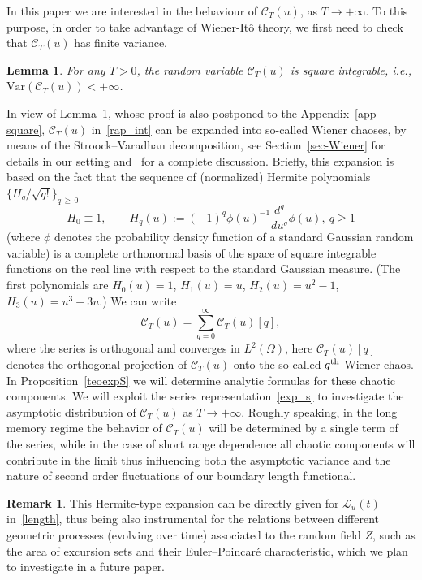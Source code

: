 \documentclass[10pt]{amsart}
\newtheorem{lemm}[theo]{Lemma}\newtheorem{prop}[theo]{Proposition}\newtheorem{coro}[theo]{Corollary}\newtheorem{conj}[theo]{Conjecture}
\theoremstyle{definition}\newtheorem{defi}[theo]{Definition}\newtheorem{rema}[theo]{Remark}\newtheorem{exam}[theo]{Example}\newtheorem{exem}[theo]{Example}\newtheorem{nota}[theo]{Notation}
\newcommand{\clC}{\mathcal{C}}
\newcommand{\clL}{\mathcal{L}}
\newcommand{\rVar}{\mathrm{Var}}
\begin{document}
In this paper we are interested in the behaviour of $\clC_T(u)$, as $ T\to +\infty$. To this purpose, in order to take advantage of Wiener-It\^o theory, we first need to check that $\clC_T(u)$ has finite variance.

\begin{lemm}\label{squareL}
For any $T>0$, the random variable $\clC_T(u)$ is square integrable, i.e., $\rVar(\clC_T(u)) < +\infty$.
\end{lemm}

In view of Lemma~\ref{squareL}, whose proof is also postponed to the Appendix~\ref{app-square}, $\clC_T (u)$ in~\eqref{rap_int} can be expanded into so-called Wiener chaoses, by means of the Stroock--Varadhan decomposition, see Section~\ref{sec-Wiener} for details in our setting and~\cite[\S~2.2] {noupebook} for a complete discussion. Briefly, this expansion is based on the fact that the sequence of (normalized) Hermite polynomials
$\{ H_q/\sqrt{q!}\}_{q\,\ge\,0}$
\begin{equation}\label{Herm}
H_0\equiv 1,\qquad H_{q}(u):=(-1)^{q}\phi (u)^{-1}\frac{d^q}{du^q}\phi(u), \ q\ge 1
\end{equation}
(where $\phi$ denotes the probability density function of a standard Gaussian random variable) is a complete orthonormal basis of the space of square integrable functions on the real line with respect to the standard Gaussian measure. (The first polynomials are $H_0(u)=1$, $H_1(u)=u$, $ H_2(u)=u^2-1$, $H_3(u) = u^3 - 3u$.) We can write
\begin{equation}\label{exp_s}
\clC_{T}(u)=\sum_{q=0}^{\infty }\clC_{T}(u)[q],
\end{equation}
where the series is orthogonal and converges in $L^2(\Omega)$, here $\clC_{T}(u)[q]$ denotes the orthogonal projection of $\clC _T(u) $ onto the so-called $q^{\rm th}$ Wiener chaos. In Proposition~\ref{teoexpS} we will determine analytic formulas for these chaotic components. We will exploit the series representation~\eqref{exp_s} to investigate the asymptotic distribution of $\clC_T(u)$ as $T\to +\infty$. Roughly speaking, in the long memory regime the behavior of $\clC_T(u)$ will be determined by a single term of the series, while in the case of short range dependence all chaotic components will contribute in the limit thus influencing both the asymptotic variance and the nature of second order fluctuations of our boundary length functional.

\begin{rema}
This Hermite-type expansion can be directly given for $\clL _u(t)$ in~\eqref{length}, thus being also instrumental for the relations between different geometric processes (evolving over time) associated to the random field $Z$, such as the area of excursion sets and their Euler--Poincaré characteristic, which we plan to investigate in a future paper.
\end{rema}
\end{document}
